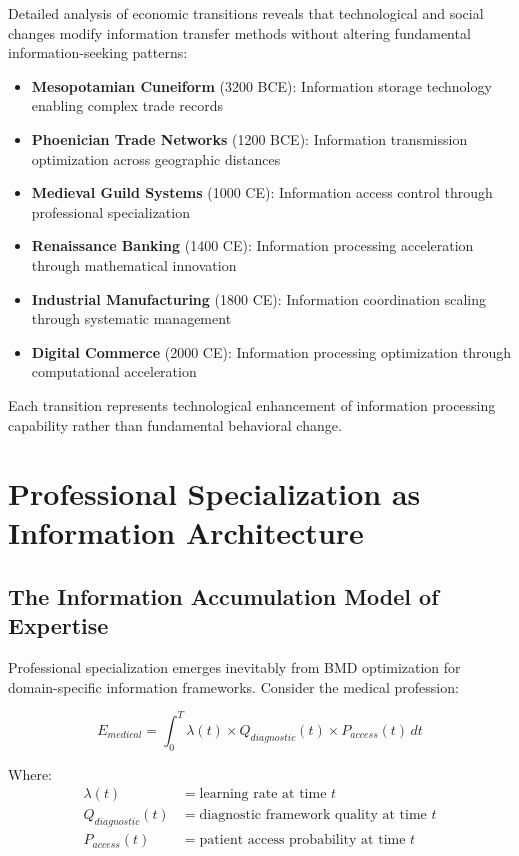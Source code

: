 \documentclass[12pt,a4paper]{article}
\begin{document}
Detailed analysis of economic transitions reveals that technological and social changes modify information transfer methods without altering fundamental information-seeking patterns:

\begin{itemize}
\item \textbf{Mesopotamian Cuneiform} (3200 BCE): Information storage technology enabling complex trade records
\item \textbf{Phoenician Trade Networks} (1200 BCE): Information transmission optimization across geographic distances
\item \textbf{Medieval Guild Systems} (1000 CE): Information access control through professional specialization
\item \textbf{Renaissance Banking} (1400 CE): Information processing acceleration through mathematical innovation
\item \textbf{Industrial Manufacturing} (1800 CE): Information coordination scaling through systematic management
\item \textbf{Digital Commerce} (2000 CE): Information processing optimization through computational acceleration
\end{itemize}

Each transition represents technological enhancement of information processing capability rather than fundamental behavioral change.

\section{Professional Specialization as Information Architecture}

\subsection{The Information Accumulation Model of Expertise}

Professional specialization emerges inevitably from BMD optimization for domain-specific information frameworks. Consider the medical profession:

\begin{equation}
E_{medical} = \int_{0}^{T} \lambda(t) \times Q_{diagnostic}(t) \times P_{access}(t) \, dt
\end{equation}

Where:
\begin{align}
\lambda(t) &= \text{learning rate at time } t \\
Q_{diagnostic}(t) &= \text{diagnostic framework quality at time } t \\
P_{access}(t) &= \text{patient access probability at time } t
\end{align}
\end{document}
